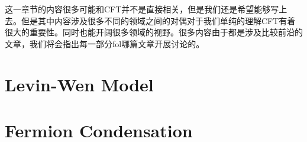 这一章节的内容很多可能和CFT并不是直接相关，但是我们还是希望能够写上去。但是其中内容涉及很多不同的领域之间的对偶对于我们单纯的理解CFT有着很大的重要性。同时也能开阔很多领域的视野。很多内容由于都是涉及比较前沿的文章，我们将会指出每一部分fol哪篇文章开展讨论的。

\section{Levin-Wen Model}



\section{Fermion Condensation}